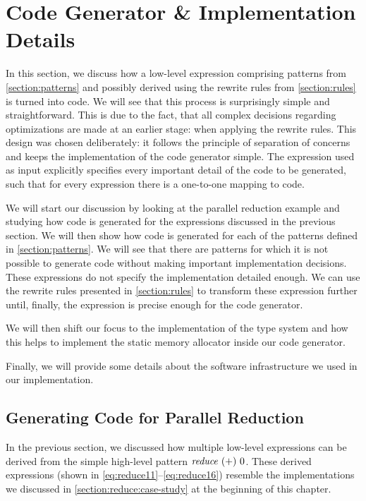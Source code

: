 \section{Code Generator \& Implementation Details}
\label{section:opencl:code:generator}
In this section, we discuss how a low-level expression comprising patterns from \autoref{section:patterns} and possibly derived using the rewrite rules from \autoref{section:rules} is turned into \OpenCL code.
We will see that this process is surprisingly simple and straightforward.
This is due to the fact, that all complex decisions regarding optimizations are made at an earlier stage: when applying the rewrite rules.
This design was chosen deliberately:
it follows the principle of separation of concerns and keeps the implementation of the code generator simple.
The expression used as input explicitly specifies every important detail of the \OpenCL code to be generated, such that for every expression there is a one-to-one mapping to \OpenCL code.

We will start our discussion by looking at the parallel reduction example and studying how \OpenCL code is generated for the expressions discussed in the previous section.
We will then show how \OpenCL code is generated for each of the patterns defined in \autoref{section:patterns}.
We will see that there are patterns for which it is not possible to generate \OpenCL code without making important implementation decisions.
These expressions do not specify the \OpenCL implementation detailed enough.
We can use the rewrite rules presented in \autoref{section:rules} to transform these expression further until, finally, the expression is precise enough for the code generator.

We will then shift our focus to the implementation of the type system and how this helps to implement the static memory allocator inside our code generator.

Finally, we will provide some details about the software infrastructure we used in our implementation.

\subsection{Generating \OpenCL Code for Parallel Reduction}
In the previous section, we discussed how multiple low-level expressions can be derived from the simple high-level pattern $\text{\textit{reduce}}\ (+)\ 0$.
These derived expressions (shown in \autoref{eq:reduce11}--\autoref{eq:reduce16}) resemble the \OpenCL implementations we discussed in \autoref{section:reduce:case-study} at the beginning of this chapter.

